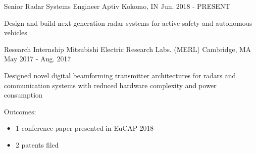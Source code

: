 
\begin{cventries}

  \cventry
    {Senior Radar Systems Engineer} %
    {Aptiv} %
    {Kokomo, IN} %
    {Jun. 2018 - PRESENT} %
    {
      \begin{cvitems} %
        \item {Design and build next generation radar systems for active safety and autonomous vehicles}
      \end{cvitems}
    }

  \cventry
    {Research Internship} %
    {Mitsubishi Electric Research Labs. (MERL)} %
    {Cambridge, MA} %
    {May 2017 - Aug. 2017} %
    {
      \begin{cvitems} %
        \item {Designed novel digital beamforming transmitter architectures for radars and communication systems with reduced hardware complexity and power consumption}
        \item {Outcomes:
        \begin{itemize}%
            \item 1 conference paper presented in EuCAP 2018
            \item 2 patents filed
        \end{itemize}
        }
      \end{cvitems}
    }

\end{cventries}
